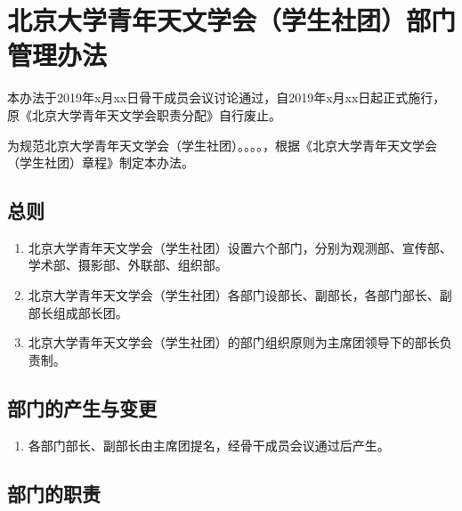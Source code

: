 \chapter{北京大学青年天文学会（学生社团）部门管理办法}

本办法于2019年x月xx日骨干成员会议讨论通过，自2019年x月xx日起正式施行，原《北京大学青年天文学会职责分配》自行废止。

为规范北京大学青年天文学会（学生社团）。。。。，根据《北京大学青年天文学会（学生社团）章程》制定本办法。

\section{总则}

\begin{enumerate}
    \item 北京大学青年天文学会（学生社团）设置六个部门，分别为观测部、宣传部、学术部、摄影部、外联部、组织部。
        
    \item 北京大学青年天文学会（学生社团）各部门设部长、副部长，各部门部长、副部长组成部长团。
    
    \item 北京大学青年天文学会（学生社团）的部门组织原则为主席团领导下的部长负责制。
\end{enumerate}

\section{部门的产生与变更}

\begin{enumerate}[resume]
    \item 各部门部长、副部长由主席团提名，经骨干成员会议通过后产生。
\end{enumerate}

\section{部门的职责}

